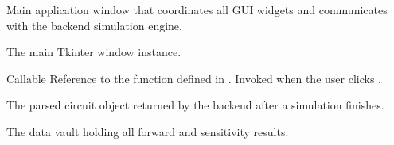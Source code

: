\documentclass[letterpaper,10pt,english]{sphinxmanual}
\begin{document}
\begin{fulllineitems}
\label{\detokenize{gui:CircuitSimulatorGUI}}
\pysigstartsignatures
\pysiglinewithargsret
{}
{\sphinxparamcomma {}}
{}
\pysigstopsignatures
\sphinxAtStartPar
Main application window that coordinates all GUI widgets and
communicates with the backend simulation engine.

\begin{fulllineitems}
\label{\detokenize{gui:CircuitSimulatorGUI.root}}
\pysigstartsignatures
\pysigline
{}
\pysigstopsignatures
\sphinxAtStartPar
{} \textendash{} The main Tkinter window instance.

\end{fulllineitems}


\begin{fulllineitems}
\label{\detokenize{gui:CircuitSimulatorGUI.run_simulation_core}}
\pysigstartsignatures
\pysigline
{}
\pysigstopsignatures
\sphinxAtStartPar
Callable \textendash{} Reference to the  function defined in
.  Invoked when the user clicks .

\end{fulllineitems}


\begin{fulllineitems}
\label{\detokenize{gui:CircuitSimulatorGUI.circuit}}
\pysigstartsignatures
\pysigline
{}
\pysigstopsignatures
\sphinxAtStartPar
{} \textendash{} The parsed circuit object returned
by the backend after a simulation finishes.

\end{fulllineitems}


\begin{fulllineitems}
\label{\detokenize{gui:CircuitSimulatorGUI.result}}
\pysigstartsignatures
\pysigline
{}
\pysigstopsignatures
\sphinxAtStartPar
{} \textendash{} The data vault holding all
forward and sensitivity results.

\end{fulllineitems}


\end{fulllineitems}
\end{document}
